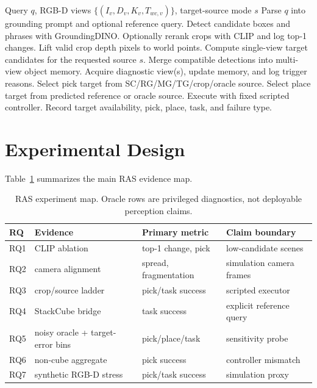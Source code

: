 \documentclass[preprint,12pt]{elsarticle}
\begin{document}
\begin{algorithm}[t]
\caption{Query-to-Grasp target selection and diagnostic execution}
\label{alg:query-to-grasp}
\begin{algorithmic}[1]
\Require Query $q$, RGB-D views $\{(I_v,D_v,K_v,T_{wc,v})\}$, target-source mode $s$
\State Parse $q$ into grounding prompt and optional reference query.
  \State Detect candidate boxes and phrases with GroundingDINO.
  \State Optionally rerank crops with CLIP and log top-1 changes.
  \State Lift valid crop depth pixels to world points.
  \State Compute single-view target candidates for the requested source $s$.
\EndFor
\State Merge compatible detections into multi-view object memory.
  \State Acquire diagnostic view(s), update memory, and log trigger reasons.
\EndIf
\State Select pick target from SC/RG/MG/TG/crop/oracle source.
  \State Select place target from predicted reference or oracle source.
\EndIf
\State Execute with fixed scripted controller.
\State Record target availability, pick, place, task, and failure type.
\end{algorithmic}
\end{algorithm}

\section{Experimental Design}

Table~\ref{tab:experiment-map} summarizes the main RAS evidence map.

\begin{table}[t]
\centering
\caption{RAS experiment map. Oracle rows are privileged diagnostics, not
deployable perception claims.}
\label{tab:experiment-map}
\begin{tabular}{llll}
\toprule
RQ & Evidence & Primary metric & Claim boundary \\
\midrule
RQ1 & CLIP ablation & top-1 change, pick & low-candidate scenes \\
RQ2 & camera alignment & spread, fragmentation & simulation camera frames \\
RQ3 & crop/source ladder & pick/task success & scripted executor \\
RQ4 & StackCube bridge & task success & explicit reference query \\
RQ5 & noisy oracle + target-error bins & pick/place/task & sensitivity probe \\
RQ6 & non-cube aggregate & pick success & controller mismatch \\
RQ7 & synthetic RGB-D stress & pick/task success & simulation proxy \\
\bottomrule
\end{tabular}
\end{table}
\end{document}
